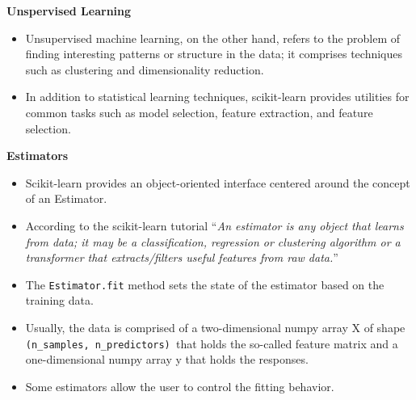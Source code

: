 \documentclass[MASTER.tex]{subfiles}
\begin{document}
\begin{frame}
	\Large
	
\noindent \textbf{Unspervised Learning}
	\begin{itemize}
		\item	
	Unsupervised machine learning, on the other hand, refers to the problem of finding interesting patterns or structure in the data; it comprises techniques such as clustering and dimensionality reduction.
	\item  In addition to statistical learning techniques, scikit-learn provides utilities for common tasks such as model selection, feature extraction, and feature selection.
\end{itemize}
\end{frame}
\begin{frame}[fragile]
	\Large
\noindent	\textbf{Estimators}
\begin{itemize}
\item Scikit-learn provides an object-oriented interface centered around the concept of an Estimator. \item According to the scikit-learn tutorial “\textit{An estimator is any object that learns from data; it may be a classification, regression or clustering algorithm or a transformer that extracts/filters useful features from raw data.}” 	
\end{itemize}
\end{frame}


\begin{frame}[fragile]
	\Large
\begin{itemize}
\item The \texttt{Estimator.fit} method sets the state of the estimator based on the training data. 
\item Usually, the data is comprised of a two-dimensional numpy array X of shape \texttt{(n\_samples, n\_predictors) }that holds the so-called feature matrix and a one-dimensional numpy array y that holds the responses. 
\item Some estimators allow the user to control the fitting behavior. 
\end{itemize}
\end{frame}
\end{document}
